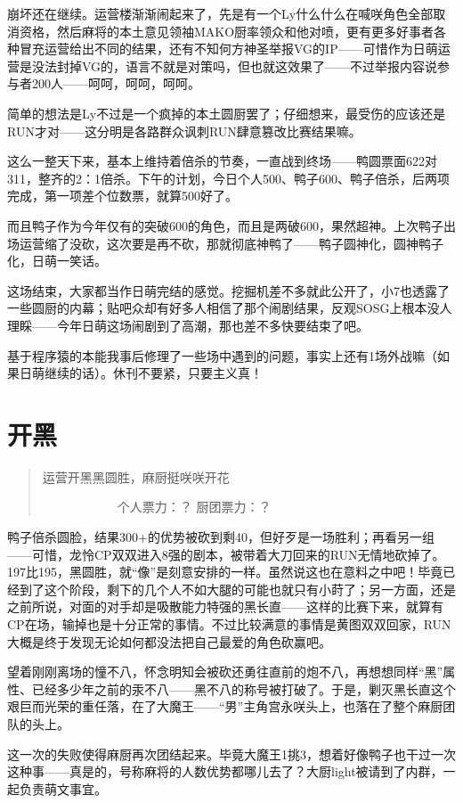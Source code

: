 崩坏还在继续。运营楼渐渐闹起来了，先是有一个Ly什么什么在喊咲角色全部取消资格，然后麻将的本土意见领袖MAKO厨率领众和他对喷，更有更多好事者各种冒充运营给出不同的结果，还有不知何方神圣举报VG的IP——可惜作为日萌运营是没法封掉VG的，语言不就是对策吗，但也就这效果了——不过举报内容说参与者200人——呵呵，呵呵，呵呵。

简单的想法是Ly不过是一个疯掉的本土圆厨罢了；仔细想来，最受伤的应该还是RUN才对——这分明是各路群众讽刺RUN肆意篡改比赛结果嘛。

这么一整天下来，基本上维持着倍杀的节奏，一直战到终场——鸭圆票面622对311，整齐的2：1倍杀。下午的计划，今日个人500、鸭子600、鸭子倍杀，后两项完成，第一项差个位数票，就算500好了。

而且鸭子作为今年仅有的突破600的角色，而且是两破600，果然超神。上次鸭子出场运营缩了没砍，这次要是再不砍，那就彻底神鸭了——鸭子圆神化，圆神鸭子化，日萌一笑话。

这场结束，大家都当作日萌完结的感觉。挖掘机差不多就此公开了，小7也透露了一些圆厨的内幕；贴吧众却有好多人相信了那个闹剧结果，反观SOSG上根本没人理睬——今年日萌这场闹剧到了高潮，那也差不多快要结束了吧。

基于程序猿的本能我事后修理了一些场中遇到的问题，事实上还有1场外战嘛（如果日萌继续的话）。休刊不要紧，只要主义真！


\chapter{开黑}
\begin{quote}
运营开黑黑圆胜，麻厨挺咲咲开花

　　　　　　个人票力：？ 厨团票力：？
\end{quote}

鸭子倍杀圆脸，结果300+的优势被砍到剩40，但好歹是一场胜利；再看另一组——可惜，龙怜CP双双进入8强的剧本，被带着大刀回来的RUN无情地砍掉了。197比195，黑圆胜，就“像”是刻意安排的一样。虽然说这也在意料之中吧！毕竟已经到了这个阶段，剩下的几个人不如大腿的可能也就只有小莳了；另一方面，还是之前所说，对面的对手却是吸散能力特强的黑长直——这样的比赛下来，就算有CP在场，输掉也是十分正常的事情。不过比较满意的事情是黄图双双回家，RUN大概是终于发现无论如何都没法把自己最爱的角色砍赢吧。

望着刚刚离场的憧不八，怀念明知会被砍还勇往直前的炮不八，再想想同样“黑”属性、已经多少年之前的汞不八——黑不八的称号被打破了。于是，剿灭黑长直这个艰巨而光荣的重任落，在了大魔王——“男”主角宫永咲头上，也落在了整个麻厨团队的头上。

这一次的失败使得麻厨再次团结起来。毕竟大魔王1挑3，想着好像鸭子也干过一次这种事——真是的，号称麻将的人数优势都哪儿去了？大厨light被请到了内群，一起负责萌文事宜。

